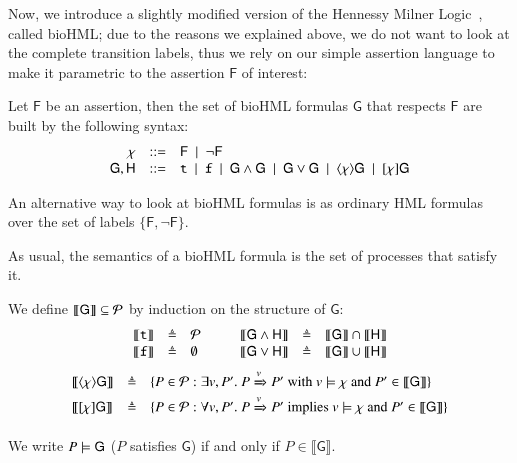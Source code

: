 Now, we introduce a slightly modified version of the Hennessy Milner Logic~\cite{HM80}, called bioHML; due to the reasons we explained above, we do not want to look at the complete transition labels, thus we rely on our simple assertion language to make it parametric to the assertion $\mathsf{F}$ of interest:

\begin{definition}[BioHML]
Let   $\mathsf{F}$ be an assertion, then 
the set of bioHML formulas $\mathsf{G}$ that respects $\mathsf{F}$ are built by the following syntax:
$$
\begin{array}{rcl}
\chi & ::= & \mathsf{F}~\mid~ \neg \mathsf{F}\\
\mathsf{G},\mathsf{H} &::= &{\tt t} ~\mid~ {\tt f} ~\mid~ \mathsf{G}\wedge \mathsf{G} ~\mid~ \mathsf{G} \vee \mathsf{G} ~\mid~ \langle \chi \rangle \mathsf{G} ~\mid~ [\chi]\mathsf{G}
\end{array}
$$
\end{definition}

\begin{remark}
An alternative way to look at bioHML formulas is as ordinary HML formulas over the set of labels $\{\mathsf{F},\neg \mathsf{F}\}$.
\end{remark}

As usual, the semantics of a bioHML formula is the set of processes that satisfy it.

\begin{definition}
 We define $\llbracket \mathsf{G}\rrbracket \subseteq {\cal P}$ by induction on the structure of $\mathsf{G}$:
\[
\begin{array}{ccl@{\hspace{1cm}}ccl}
 \llbracket {\tt t}\rrbracket &\defeq& {\cal P} &  \llbracket \mathsf{G}\wedge \mathsf{H}\rrbracket &\defeq&  \llbracket \mathsf{G}\rrbracket  \cap \llbracket \mathsf{H}\rrbracket  \\
\llbracket {\tt f}\rrbracket& \defeq& \emptyset &
  \llbracket \mathsf{G}\vee \mathsf{H}\rrbracket &\defeq&  \llbracket \mathsf{G}\rrbracket  \cup \llbracket \mathsf{H}\rrbracket \\
\end{array}
\]
\[
\begin{array}{lcl}
 \llbracket  \langle \chi \rangle \mathsf{G} \rrbracket &\triangleq& \{P \in {\cal P}: \exists v,P'.\ P\xRightarrow{v}P' \mbox{ with } v \models \chi \mbox{ and } P' \in  \llbracket  \mathsf{G} \rrbracket\} \\
 \llbracket [\chi]\mathsf{G} \rrbracket &\triangleq& \{P \in {\cal P}: \forall v,P'.\ P\xRightarrow{v}P' \mbox{ implies } v \models \chi \mbox{ and } P' \in  \llbracket  \mathsf{G} \rrbracket\}
\end{array}
\]

We write $P \models \mathsf{G}$ ($P$ satisfies $\mathsf{G}$) if and only if $P \in  \llbracket \mathsf{G} \rrbracket$.
\end{definition}

